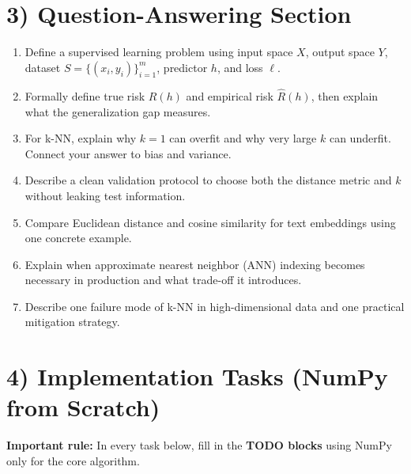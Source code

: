 \section*{3) Question-Answering Section}
\begin{enumerate}[label=\textbf{Q\arabic*.}]
  \item Define a supervised learning problem using input space $X$, output space $Y$, dataset $S=\{(x_i,y_i)\}_{i=1}^m$, predictor $h$, and loss $\ell$.
  \item Formally define true risk $R(h)$ and empirical risk $\hat{R}(h)$, then explain what the generalization gap measures.
  \item For k-NN, explain why $k=1$ can overfit and why very large $k$ can underfit. Connect your answer to bias and variance.
  \item Describe a clean validation protocol to choose both the distance metric and $k$ without leaking test information.
  \item Compare Euclidean distance and cosine similarity for text embeddings using one concrete example.
  \item Explain when approximate nearest neighbor (ANN) indexing becomes necessary in production and what trade-off it introduces.
  \item Describe one failure mode of k-NN in high-dimensional data and one practical mitigation strategy.
\end{enumerate}

\section*{4) Implementation Tasks (NumPy from Scratch)}
\textbf{Important rule:} In every task below, fill in the \textbf{TODO blocks} using NumPy only for the core algorithm.

